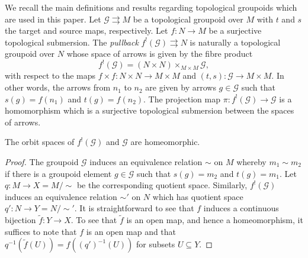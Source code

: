 \documentclass[10pt]{amsart}
\numberwithin{theoremalpha}{section}
\numberwithin{equation}{section}
\numberwithin{definition}{section}
\numberwithin{theorem}{section}
\numberwithin{proposition}{section}
\numberwithin{lemma}{section}
\numberwithin{example}{section}
\numberwithin{remark}{section}
\numberwithin{corollary}{section}
\numberwithin{question}{section}
\numberwithin{problem}{section}
\numberwithin{assumption}{section}
\theoremstyle{named}
\numberwithin{equation}{section}
\begin{document}
We recall the main definitions and results regarding topological groupoids which are used in this paper. Let $\mathcal{G} \rightrightarrows M$ be a topological groupoid over $M$ with $t$ and $s$ the target and source maps, respectively. Let $f: N \to M$ be a surjective topological submersion. The \emph{pullback} $f^{!}(\mathcal{G}) \rightrightarrows N$ is naturally a topological groupoid over $N$ whose space of arrows is given by the fibre product 
\[
f^{!}(\mathcal{G}) = (N \times N) \times_{M \times M} \mathcal{G},
\]
with respect to the maps $f \times f : N \times N \to M \times M$ and $(t, s) : \mathcal{G} \to M \times M$. In other words, the arrows from $n_{1}$ to $n_{2}$ are given by arrows $g \in \mathcal{G}$ such that $s(g) = f(n_{1})$ and $t(g) = f(n_{2})$. The projection map $\pi: f^{!}(\mathcal{G}) \to \mathcal{G}$ is a homomorphism which is a surjective topological submersion between the spaces of arrows. 

\begin{lemma} \label{Moritatohomeo}
The orbit spaces of $f^{!}(\mathcal{G})$ and $\mathcal{G}$ are homeomorphic. 
\end{lemma}
\begin{proof}
The groupoid $\mathcal{G}$ induces an equivalence relation $\sim$ on $M$ whereby $m_{1} \sim m_{2}$ if there is a groupoid element $g \in \mathcal{G}$ such that $s(g) = m_{2}$ and $t(g) = m_{1}$. Let $q: M \to X = M/\sim$ be the corresponding quotient space. Similarly, $f^{!}(\mathcal{G})$ induces an equivalence relation $\sim'$ on $N$ which has quotient space $q': N \to Y = N/\sim'$. It is straightforward to see that $f$ induces a continuous bijection $\tilde{f}: Y \to X$. To see that $\tilde{f}$ is an open map, and hence a homeomorphism, it suffices to note that $f$ is an open map and that $q^{-1}(\tilde{f}(U)) = f((q')^{-1}(U))$ for subsets $U \subseteq Y$. 
\end{proof}
\end{document}
